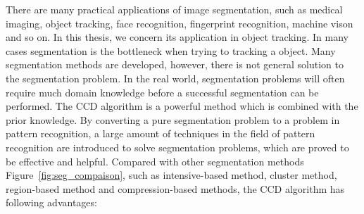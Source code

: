 There are many practical
applications of image segmentation, such as medical imaging, object
tracking, face recognition, fingerprint recognition, machine vison and
so on. In this thesis, we concern its application in object tracking.
In many cases segmentation is the bottleneck when trying to tracking a
object. Many segmentation methods are developed, however, there is not
general solution to the segmentation problem. In the real world,
segmentation problems will often require much domain knowledge before
a successful segmentation can be performed. The CCD algorithm is a
powerful method which is combined with the prior knowledge. By
converting a pure segmentation problem to a problem in pattern
recognition, a large amount of techniques in the field of pattern
recognition are introduced to solve segmentation problems, which are
proved to be effective and helpful. Compared with other segmentation
methods Figure~\ref{fig:seg_compaison}, such as intensive-based method,  cluster method, region-based
method and compression-based methods, the CCD algorithm has following
advantages:
